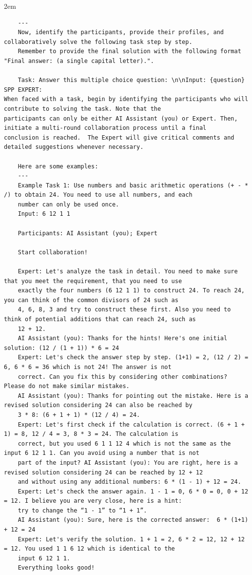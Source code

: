 \begin{adjustwidth}{2em}{}
\begin{enumerate}
\begin{verbatim}
    ---
    Now, identify the participants, provide their profiles, and collaboratively solve the following task step by step.  
    Remember to provide the final solution with the following format "Final answer: (a single capital letter).".

    Task: Answer this multiple choice question: \n\nInput: {question}
SPP EXPERT:
When faced with a task, begin by identifying the participants who will contribute to solving the task. Note that the  
participants can only be either AI Assistant (you) or Expert. Then, initiate a multi-round collaboration process until a final  
conclusion is reached.  The Expert will give critical comments and detailed suggestions whenever necessary.

    Here are some examples:
    ---
    Example Task 1: Use numbers and basic arithmetic operations (+ - * /) to obtain 24. You need to use all numbers, and each 
    number can only be used once.
    Input: 6 12 1 1

    Participants: AI Assistant (you); Expert

    Start collaboration!

    Expert: Let's analyze the task in detail. You need to make sure that you meet the requirement, that you need to use  
    exactly the four numbers (6 12 1 1) to construct 24. To reach 24, you can think of the common divisors of 24 such as  
    4, 6, 8, 3 and try to construct these first. Also you need to think of potential additions that can reach 24, such as 
    12 + 12. 
    AI Assistant (you): Thanks for the hints! Here's one initial solution: (12 / (1 + 1)) * 6 = 24
    Expert: Let's check the answer step by step. (1+1) = 2, (12 / 2) = 6, 6 * 6 = 36 which is not 24! The answer is not  
    correct. Can you fix this by considering other combinations? Please do not make similar mistakes.
    AI Assistant (you): Thanks for pointing out the mistake. Here is a revised solution considering 24 can also be reached by 
    3 * 8: (6 + 1 + 1) * (12 / 4) = 24.
    Expert: Let's first check if the calculation is correct. (6 + 1 + 1) = 8, 12 / 4 = 3, 8 * 3 = 24. The calculation is 
    correct, but you used 6 1 1 12 4 which is not the same as the input 6 12 1 1. Can you avoid using a number that is not  
    part of the input? AI Assistant (you): You are right, here is a revised solution considering 24 can be reached by 12 + 12   
    and without using any additional numbers: 6 * (1 - 1) + 12 = 24.
    Expert: Let's check the answer again. 1 - 1 = 0, 6 * 0 = 0, 0 + 12 = 12. I believe you are very close, here is a hint: 
    try to change the “1 - 1” to “1 + 1”.
    AI Assistant (you): Sure, here is the corrected answer:  6 * (1+1) + 12 = 24
    Expert: Let's verify the solution. 1 + 1 = 2, 6 * 2 = 12, 12 + 12 = 12. You used 1 1 6 12 which is identical to the  
    input 6 12 1 1. 
    Everything looks good!


\end{verbatim}
\end{enumerate}
\end{adjustwidth}
